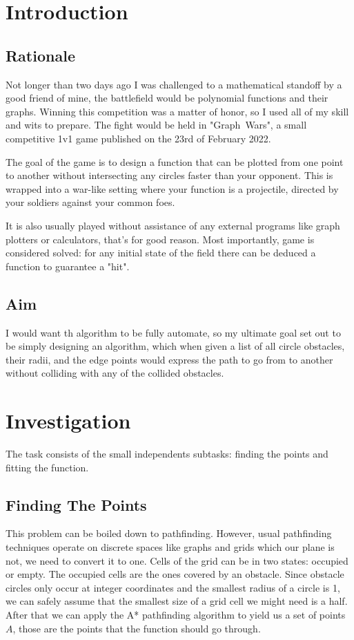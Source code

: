 \documentclass[12pt, titlepage]{article}
\title{}
\author{Artur Roos}
\date{October 2022}
\begin{document}
\maketitle
\tableofcontents

\section{Introduction}
\subsection{Rationale}
Not longer than two days ago I was challenged to a mathematical standoff by a 
good friend of mine, the battlefield would be polynomial functions and their 
graphs. Winning this competition was a matter of honor, so I used all of my 
skill and wits to prepare. The fight would be held in \mbox{"Graph Wars"}, a 
small competitive 1v1 game published on the 23rd of February 2022. 

The goal of the game is to design a function that can be plotted from one point
to another without intersecting any circles faster than your opponent. This
is wrapped into a war-like setting where your function is a projectile, directed
by your soldiers against your common foes.

It is also usually played without assistance of any external programs like 
graph plotters or calculators, that's for good reason. Most importantly, game is
considered solved: for any initial state of the field there can be deduced a 
function to guarantee a "hit". 

\subsection{Aim}
I would want th algorithm to be fully automate, so my ultimate goal 
set out to be simply designing an algorithm, which when given a list of all
circle obstacles, their radii, and the edge points would express the path to
go from to another without colliding with any of the collided obstacles.

\section{Investigation}
The task consists of the small independents subtasks: finding the points and 
fitting the function. 

\subsection{Finding The Points}
This problem can be boiled down to pathfinding. However, usual pathfinding
techniques operate on discrete spaces like graphs and grids which our plane
is not, we need to convert it to one. Cells of the grid can be in two states:
occupied or empty. The occupied cells are the ones covered by an obstacle. 
Since obstacle circles only occur at integer coordinates and the smallest
radius of a circle is 1, we can safely assume that the smallest size of a grid
cell we might need is a half. After that we can apply the A* pathfinding
algorithm to yield us a set of points $A$, those are the points that the
function should go through. 
\end{document}

